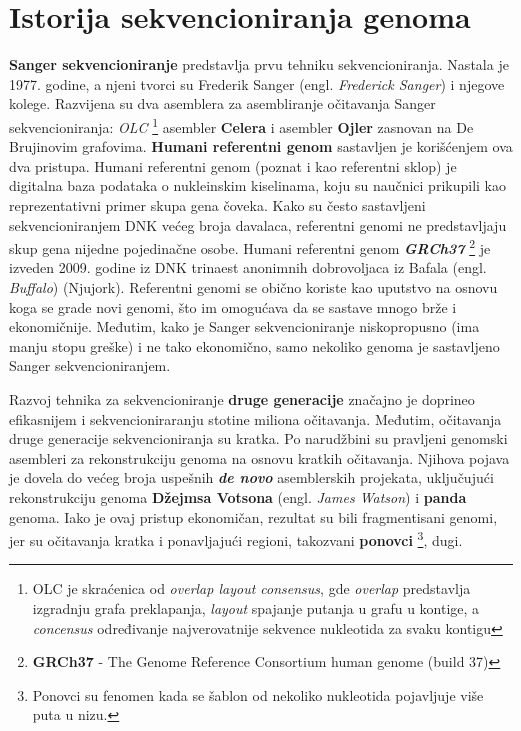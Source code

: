 \documentclass[12pt,oneside]{memoir}
\begin{document}
\newpage

\section{Istorija sekvencioniranja genoma}

\textbf{Sanger sekvencioniranje} predstavlja prvu tehniku sekvencioniranja. Nastala je 1977. godine, a njeni tvorci su Frederik Sanger (engl. \textit{Frederick Sanger}) i njegove kolege. Razvijena su dva asemblera za asembliranje očitavanja Sanger sekvencioniranja: \textit{OLC} \footnote{OLC je skraćenica od \textit{overlap layout consensus}, gde \textit{overlap} predstavlja izgradnju grafa preklapanja,
\textit{layout} spajanje putanja u grafu u kontige, a \textit{concensus} određivanje najverovatnije sekvence
nukleotida za svaku kontigu} asembler \textbf{Celera} i asembler \textbf{Ojler} zasnovan na De Brujinovim grafovima. \textbf{Humani referentni genom} sastavljen je korišćenjem ova dva pristupa. Humani referentni genom (poznat i kao referentni sklop) je digitalna baza podataka o nukleinskim kiselinama, koju su naučnici prikupili kao reprezentativni primer skupa gena čoveka. Kako su često sastavljeni sekvencioniranjem DNK većeg broja davalaca, referentni genomi ne predstavljaju skup gena nijedne pojedinačne osobe. Humani referentni genom \textit{\textbf{GRCh37}} \footnote{\textbf{GRCh37} - The Genome Reference Consortium human genome (build 37)} je izveden 2009. godine iz DNK trinaest anonimnih dobrovoljaca iz Bafala (engl. \textit{Buffalo}) (Njujork). Referentni genomi se obično koriste kao uputstvo na osnovu koga se grade novi genomi, što im omogućava da se sastave mnogo brže i ekonomičnije. Međutim, kako je Sanger sekvencioniranje niskopropusno (ima manju stopu greške) i ne tako ekonomično, samo nekoliko genoma je sastavljeno Sanger sekvencioniranjem.

Razvoj tehnika za sekvencioniranje \textbf{druge generacije} značajno je doprineo efikasnijem i sekvencioniraranju stotine miliona očitavanja. Međutim, očitavanja druge generacije sekvencioniranja su kratka. Po narudžbini su pravljeni genomski asembleri za rekonstrukciju genoma na osnovu kratkih očitavanja. Njihova pojava je dovela do većeg broja uspešnih \textbf{\textit{de novo}} asemblerskih projekata, uključujući rekonstrukciju genoma \textbf{Džejmsa Votsona} (engl. \textit{James Watson}) i \textbf{panda} genoma. Iako je ovaj pristup ekonomičan, rezultat su bili fragmentisani genomi, jer su očitavanja kratka i ponavljajući regioni, takozvani \textbf{ponovci} \footnote{Ponovci su fenomen kada se šablon od nekoliko nukleotida pojavljuje više puta u nizu.}, dugi.
\end{document}
